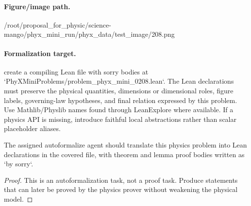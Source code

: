 \paragraph{Figure/image path.}
/root/proposal\_for\_physic/science-mango/phyx\_mini\_run/phyx\_data/test\_image/208.png

\paragraph{Formalization target.}
create a compiling Lean file with sorry bodies at `PhyXMiniProblems/problem\_phyx\_mini\_0208.lean`. The Lean declarations must preserve the physical quantities, dimensions or dimensional roles, figure labels, governing-law hypotheses, and final relation expressed by this problem.
Use Mathlib/Physlib names found through LeanExplore where available. If a physics API is missing, introduce faithful local abstractions rather than scalar placeholder aliases.

\begin{theorem}
\label{thm:physics:phyx_mini_0208:target}
The assigned autoformalize agent should translate this physics problem into Lean declarations in the covered file, with theorem and lemma proof bodies written as `by sorry`.
\end{theorem}
\begin{proof}
This is an autoformalization task, not a proof task. Produce statements that can later be proved by the physics prover without weakening the physical model.
\end{proof}

